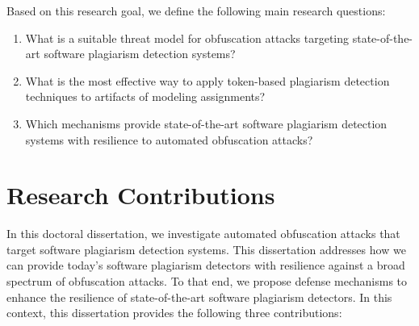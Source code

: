 \noindent
Based on this research goal, we define the following main research questions:
\begin{enumerate}[label=\textbf{RQ\arabic*}]
    \item \label{rq1} What is a suitable threat model for obfuscation attacks targeting state-of-the-art software plagiarism detection systems?
    \item \label{rq2} What is the most effective way to apply token-based plagiarism detection techniques to artifacts of modeling assignments?
    \item \label{rq3} Which mechanisms provide state-of-the-art software plagiarism detection systems with resilience to automated obfuscation attacks?
\end{enumerate}

\section{Research Contributions}
In this doctoral dissertation, we investigate automated obfuscation attacks that target software plagiarism detection systems.
This dissertation addresses how we can provide today's software plagiarism detectors with resilience against a broad spectrum of obfuscation attacks.
To that end, we propose defense mechanisms to enhance the resilience of state-of-the-art software plagiarism detectors.
In this context, this dissertation provides the following three contributions: 
%
